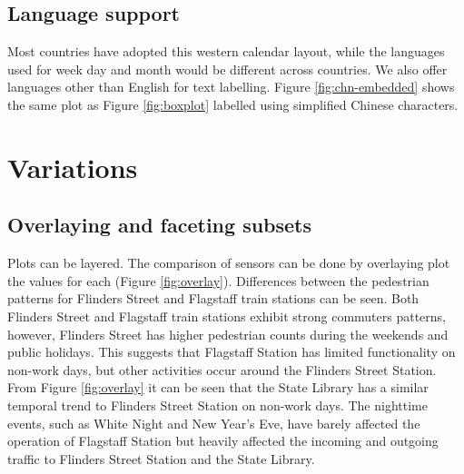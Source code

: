 \hypertarget{language-support}{%
\subsection{Language support}\label{language-support}}

Most countries have adopted this western calendar layout, while the
languages used for week day and month would be different across
countries. We also offer languages other than English for text
labelling. Figure \ref{fig:chn-embedded} shows the same plot as Figure
\ref{fig:boxplot} labelled using simplified Chinese characters.

\hypertarget{variations}{%
\section{Variations}\label{variations}}

\label{sec:examples}

\hypertarget{overlaying-and-faceting-subsets}{%
\subsection{Overlaying and faceting
subsets}\label{overlaying-and-faceting-subsets}}

Plots can be layered. The comparison of sensors can be done by
overlaying plot the values for each (Figure \ref{fig:overlay}).
Differences between the pedestrian patterns for Flinders Street and
Flagstaff train stations can be seen. Both Flinders Street and Flagstaff
train stations exhibit strong commuters patterns, however, Flinders
Street has higher pedestrian counts during the weekends and public
holidays. This suggests that Flagstaff Station has limited functionality
on non-work days, but other activities occur around the Flinders Street
Station. From Figure \ref{fig:overlay} it can be seen that the State
Library has a similar temporal trend to Flinders Street Station on
non-work days. The nighttime events, such as White Night and New Year's
Eve, have barely affected the operation of Flagstaff Station but heavily
affected the incoming and outgoing traffic to Flinders Street Station
and the State Library.

